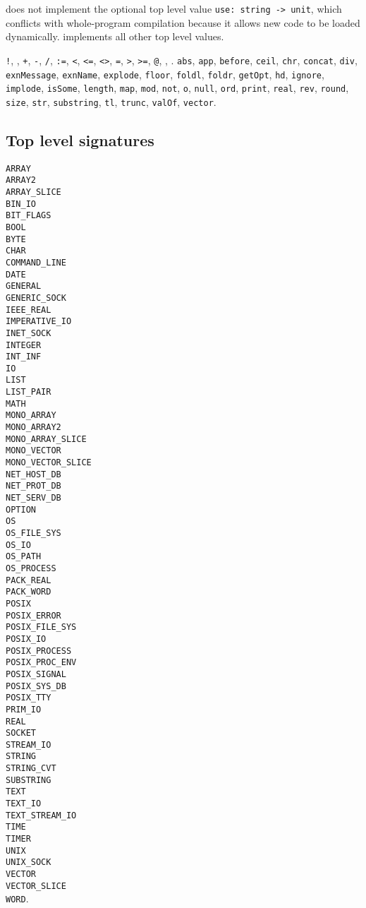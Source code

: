 {\mlton} does not implement the optional top level value
\verb+use: string -> unit+, which conflicts with whole-program
compilation because it allows new code to be loaded dynamically.
{\mlton} implements all other top level values.

{\tt !},
{\tt *},
{\tt +},
{\tt -},
{\tt /},
{\tt :=},
{\tt <},
{\tt <=},
{\tt <>},
{\tt =},
{\tt >},
{\tt >=},
{\tt @},
{\tt {}},
{\tt {}}.
{\tt abs},
{\tt app},
{\tt before},
{\tt ceil},
{\tt chr},
{\tt concat},
{\tt div},
{\tt exnMessage},
{\tt exnName},
{\tt explode},
{\tt floor},
{\tt foldl},
{\tt foldr},
{\tt getOpt},
{\tt hd},
{\tt ignore},
{\tt implode},
{\tt isSome},
{\tt length},
{\tt map},
{\tt mod},
{\tt not},
{\tt o},
{\tt null},
{\tt ord},
{\tt print},
{\tt real},
{\tt rev},
{\tt round},
{\tt size},
{\tt str},
{\tt substring},
{\tt tl},
{\tt trunc},
{\tt valOf},
{\tt vector}.
%
\newcommand{\signature}[1]{{\tt #1}\\}
\subsection{Top level signatures}
\signature{ARRAY}
\signature{ARRAY2}
\signature{ARRAY\_SLICE}
\signature{BIN\_IO}
\signature{BIT\_FLAGS}
\signature{BOOL}
\signature{BYTE}
\signature{CHAR}
\signature{COMMAND\_LINE}
\signature{DATE}
\signature{GENERAL}
\signature{GENERIC\_SOCK}
\signature{IEEE\_REAL}
\signature{IMPERATIVE\_IO}
\signature{INET\_SOCK}
\signature{INTEGER}
\signature{INT\_INF}
\signature{IO}
\signature{LIST}
\signature{LIST\_PAIR}
\signature{MATH}
\signature{MONO\_ARRAY}
\signature{MONO\_ARRAY2}
\signature{MONO\_ARRAY\_SLICE}
\signature{MONO\_VECTOR}
\signature{MONO\_VECTOR\_SLICE}
\signature{NET\_HOST\_DB}
\signature{NET\_PROT\_DB}
\signature{NET\_SERV\_DB}
\signature{OPTION}
\signature{OS}
\signature{OS\_FILE\_SYS}
\signature{OS\_IO}
\signature{OS\_PATH}
\signature{OS\_PROCESS}
\signature{PACK\_REAL}
\signature{PACK\_WORD}
\signature{POSIX}
\signature{POSIX\_ERROR}
\signature{POSIX\_FILE\_SYS}
\signature{POSIX\_IO}
\signature{POSIX\_PROCESS}
\signature{POSIX\_PROC\_ENV}
\signature{POSIX\_SIGNAL}
\signature{POSIX\_SYS\_DB}
\signature{POSIX\_TTY}
\signature{PRIM\_IO}
\signature{REAL}
\signature{SOCKET}
\signature{STREAM\_IO}
\signature{STRING}
\signature{STRING\_CVT}
\signature{SUBSTRING}
\signature{TEXT}
\signature{TEXT\_IO}
\signature{TEXT\_STREAM\_IO}
\signature{TIME}
\signature{TIMER}
\signature{UNIX}
\signature{UNIX\_SOCK}
\signature{VECTOR}
\signature{VECTOR\_SLICE}
{\tt WORD}.
%
\newcommand{\fullmodule}[2]{{\tt #1: #2}\\ }
